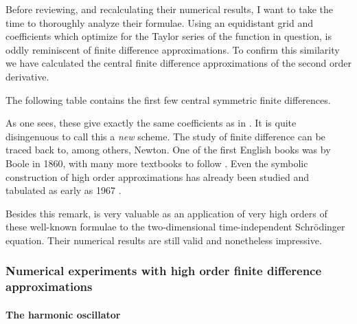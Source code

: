 Before reviewing, and recalculating their numerical results, I want to take the time to thoroughly analyze their formulae. Using an equidistant grid and coefficients which optimize for the Taylor series of the function in question, is oddly reminiscent of finite difference approximations. To confirm this similarity we have calculated the central finite difference approximations of the second order derivative.

The following table contains the first few central symmetric finite differences.
\begin{center}
    
\end{center}

As one sees, these give exactly the same coefficients as in \cite{wang_new_2009}. It is quite disingenuous to call this a \emph{new} scheme. The study of finite difference can be traced back to, among others, Newton. One of the first English books was by Boole \cite{boole_calculus_1860} in 1860, with many more textbooks to follow \cite{thomson_calculus_1933,jordan_calculus_1965}. Even the symbolic construction of high order approximations has already been studied and tabulated as early as 1967 \cite{ballester_construction_1967,keller_symbolic_1978,fornberg_generation_1988}.


Besides this remark, \cite{wang_new_2009} is very valuable as an application of very high orders of these well-known formulae to the two-dimensional time-independent Schrödinger equation. Their numerical results are still valid and nonetheless impressive.

\subsubsection{Numerical experiments with high order finite difference approximations}

\paragraph{The harmonic oscillator}

